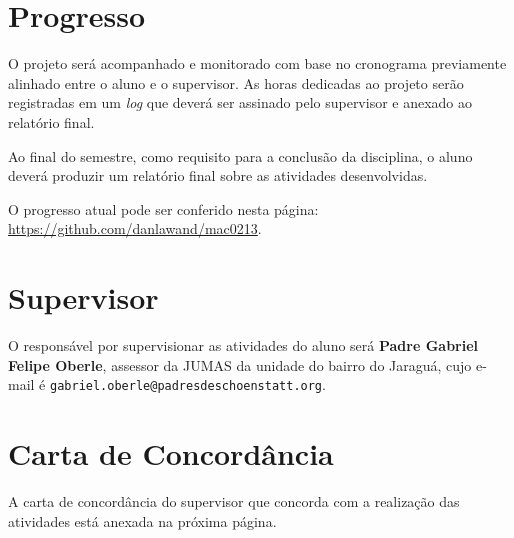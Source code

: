 \documentclass{article}
\begin{document}
\section{Progresso}

O projeto será acompanhado e monitorado com base no cronograma previamente alinhado entre o aluno e o supervisor. As horas dedicadas ao projeto serão registradas em um \textit{log} que deverá ser assinado pelo supervisor e anexado ao relatório final.

Ao final do semestre, como requisito para a conclusão da disciplina, o aluno deverá produzir um relatório final sobre as atividades desenvolvidas.

O progresso atual pode ser conferido nesta página: \url{https://github.com/danlawand/mac0213}.

\section{Supervisor}

O responsável por supervisionar as atividades do aluno  será \textbf{Padre Gabriel Felipe Oberle}, assessor da JUMAS da unidade do bairro do Jaraguá, cujo e-mail é \texttt{gabriel.oberle@padresdeschoenstatt.org}.

\section{Carta de Concordância}

A carta de concordância do supervisor que concorda com a realização das atividades está anexada na próxima página.


\end{document}
